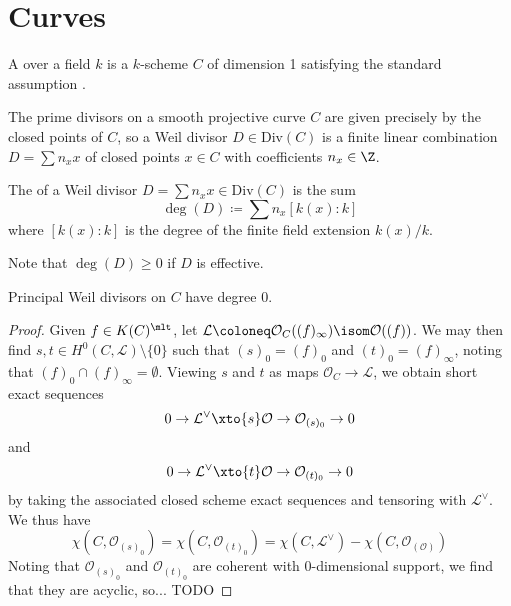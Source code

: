 \documentclass[wip, algebra]{bsteffan-lecturenotes}
\newcommand{\cO}{\mathcal{O}}
\newcommand{\cL}{\mathcal{L}}
\newcommand{\Div}{\mathrm{Div}}
\begin{document}
\section{Curves}
\begin{definition}
	A  over a field $k$ is a $k$-scheme $C$ of dimension 1 satisfying the standard assumption .
\end{definition}
The prime divisors on a smooth projective curve $C$ are given precisely by the closed points of $C$, so a Weil divisor $D \in \Div(C)$ is a finite linear combination $D = \sum n_x x$ of closed points $x \in C$ with coefficients $n_x \in \Z$.
\begin{definition}
	The  of a Weil divisor $D  = \sum n_x x \in \Div(C)$ is the sum
	\begin{equation*}
		\deg(D) \coloneq \sum n_x [k(x) : k]
	\end{equation*}
	where $[k(x) : k]$ is the degree of the finite field extension $k(x) / k$.
\end{definition}
Note that $\deg(D) \geq 0$ if $D$ is effective.
\begin{proposition}
	Principal Weil divisors on $C$ have degree 0.
\end{proposition}
\begin{proof}
	Given $f \in K(C)^\mlt$, let $\cL \coloneq \cO_C((f)_\infty) \isom \cO((f))$.
	We may then find $s, t \in H^0(C, \cL) \setminus \{0\}$ such that $(s)_0 = (f)_0$ and $(t)_0 = (f)_\infty$, noting that $(f)_0 \cap (f)_\infty = \emptyset$.
	Viewing $s$ and $t$ as maps $\cO_C \to \cL$, we obtain short exact sequences
	\begin{equation*}
		0 \to \cL^\vee \xto{s} \cO \to \cO_{(s)_0} \to 0
	\end{equation*}
	and 
	\begin{equation*}
		0 \to \cL^\vee \xto{t} \cO \to \cO_{(t)_0} \to 0
	\end{equation*}
	by taking the associated closed scheme exact sequences and tensoring with $\cL^\vee$.
	We thus have
	\begin{equation*}
		\chi(C, \cO_{(s)_0}) = \chi(C, \cO_{(t)_0}) = \chi(C, \cL^\vee) - \chi(C, \cO_{(\cO)})
	\end{equation*}
	Noting that $\cO_{(s)_0}$ and $\cO_{(t)_0}$ are coherent with 0-dimensional support, we find that they are acyclic, so...
	TODO
\end{proof}
\end{document}
